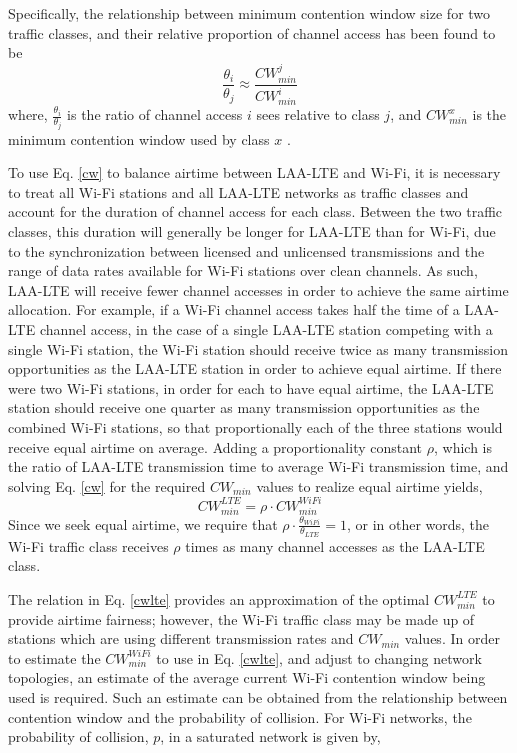 Specifically, the relationship between minimum contention window size for two traffic classes, and their relative proportion of channel access has been found to be
\begin{equation}\label{cw}
\frac{\theta_i}{\theta_j} \approx \frac{CW^j_{min}}{CW^i_{min}}
\end{equation}
where, $\frac{\theta_i}{\theta_j}$ is the ratio of channel access $i$ sees relative to class $j$, and $CW^x_{min}$ is the minimum contention window used by class $x$ \cite{chou}\cite{yoon}.  

To use Eq. \ref{cw} to balance airtime between \mbox{LAA-LTE} and \mbox{Wi-Fi}, it is necessary to treat all \mbox{Wi-Fi} stations and all LAA-LTE networks as traffic classes and account for the duration of channel access for each class. Between the two traffic classes, this duration will generally be longer for LAA-LTE than for Wi-Fi, due to the synchronization between licensed and unlicensed transmissions and the range of data rates available for Wi-Fi stations over clean channels.  As such, LAA-LTE will receive fewer channel accesses in order to achieve the same airtime allocation. For example, if a \mbox{Wi-Fi} channel access takes half the time of a \mbox{LAA-LTE} channel access, in the case of a single \mbox{LAA-LTE} station competing with a single \mbox{Wi-Fi} station, the \mbox{Wi-Fi} station should receive twice as many transmission opportunities as the \mbox{LAA-LTE} station in order to achieve equal airtime.  If there were two \mbox{Wi-Fi} stations, in order for each to have equal airtime, the \mbox{LAA-LTE} station should receive one quarter as many transmission opportunities as the combined \mbox{Wi-Fi} stations, so that proportionally each of the three stations would receive equal airtime on average.  Adding a proportionality constant $\rho$, which is the ratio of \mbox{LAA-LTE} transmission time to average \mbox{Wi-Fi} transmission time, and solving Eq. \ref{cw} for the required $CW_{min}$ values to realize equal airtime yields,
\begin{equation}\label{cwlte}
CW^{LTE}_{min} = \rho\cdot{CW^{WiFi}_{min}}
\end{equation}
Since we seek equal airtime, we require that $\rho\cdot\frac{\theta_{WiFi}}{\theta_{LTE}} = 1$, or in other words, the Wi-Fi traffic class receives $\rho$ times as many channel accesses as the LAA-LTE class.

The relation in Eq. \ref{cwlte} provides an approximation of the optimal $CW^{LTE}_{min}$ to provide airtime fairness; however, the \mbox{Wi-Fi} traffic class may be made up of stations which are using different transmission rates and $CW_{min}$ values. In order to estimate the $CW^{WiFi}_{min}$ to use in Eq. \ref{cwlte}, and adjust to changing network topologies, an estimate of the average current Wi-Fi contention window being used is required.  Such an estimate can be obtained from the relationship between contention window and the probability of collision. For \mbox{Wi-Fi} networks, the probability of collision, $p$, in a saturated network is given by, 

